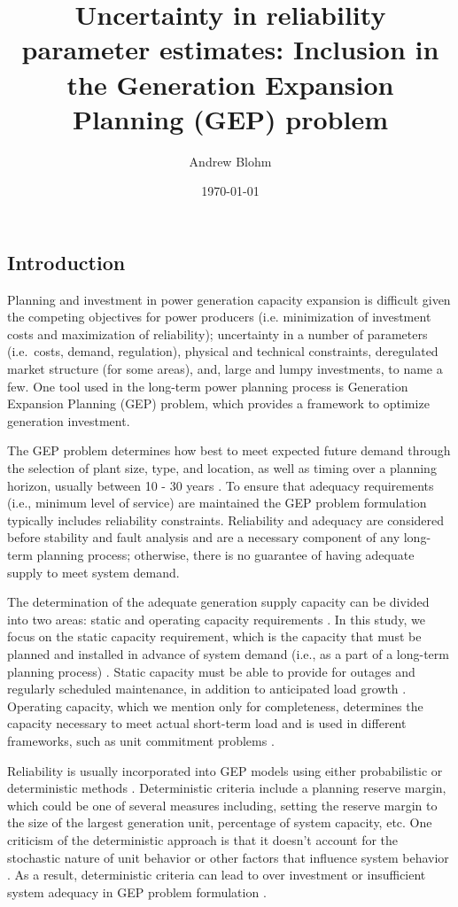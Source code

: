 \documentclass[10pt]{amsart}
\title{Uncertainty in reliability parameter estimates: Inclusion in the Generation Expansion Planning (GEP) problem}
\author{Andrew Blohm}
\date{\today}
\begin{document}
\maketitle


\subsection{Introduction}
	Planning and investment in power generation capacity expansion is difficult given the competing objectives for power producers (i.e. minimization of investment costs and maximization of reliability); uncertainty in a number of parameters (i.e.\ costs, demand, regulation), physical and technical constraints, deregulated market structure (for some areas), and, large and lumpy investments, to name a few. 
	One tool used in the long-term power planning process is Generation Expansion Planning (GEP) problem, which provides a framework to optimize generation investment.
	
	The GEP problem determines how best to meet expected future demand through the selection of plant size, type, and location, as well as timing over a planning horizon, usually between 10 - 30 years \parencite{hemmati:2013ab}. 
	To ensure that adequacy requirements (i.e., minimum level of service) are maintained the GEP problem formulation typically includes reliability constraints.
	Reliability and adequacy are considered before stability and fault analysis and are a necessary component of any long-term planning process; otherwise, there is no guarantee of having adequate supply to meet system demand.

	The determination of the adequate generation supply capacity can be divided into two areas: static and operating capacity requirements \parencite{billinton1984reliability}.
	In this study, we focus on the static capacity requirement, which is the capacity that must be planned and installed in advance of system demand (i.e., as a part of a long-term planning process) \parencite{billinton1984reliability}.
	Static capacity must be able to provide for outages and regularly scheduled maintenance, in addition to anticipated load growth \parencite{billinton1984reliability}.
	Operating capacity, which we mention only for completeness, determines the capacity necessary to meet actual short-term load and is used in different frameworks, such as unit commitment problems \parencite{billinton1984reliability}.
	 
	Reliability is usually incorporated into GEP models using either probabilistic or deterministic methods \parencite{aghaei:2013aa}. 
	Deterministic criteria include a planning reserve margin, which could be one of several measures including, setting the reserve margin to the size of the largest generation unit, percentage of system capacity, etc. 
	One criticism of the deterministic approach is that it doesn't account for the stochastic nature of unit behavior or other factors that influence system behavior \parencite{aghaei:2013aa}.
	As a result, deterministic criteria can lead to over investment or insufficient system adequacy in GEP problem formulation \parencite{aghaei:2013aa}.  
	
\end{document}
